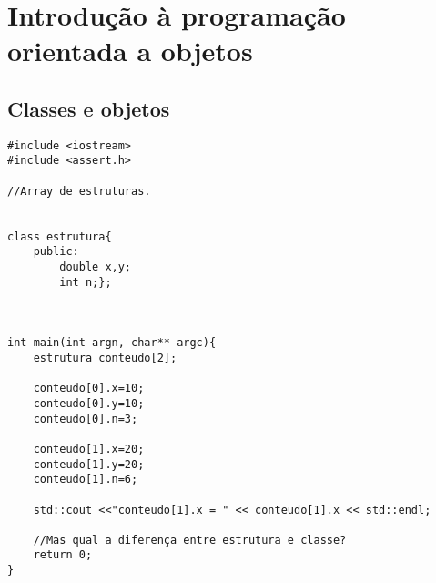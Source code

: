 
\chapter{Introdução à programação orientada a objetos}
\section{Classes e objetos}


\begin{verbatim}
#include <iostream>
#include <assert.h>

//Array de estruturas.


class estrutura{
	public:
		double x,y;
		int n;};



int main(int argn, char** argc){
	estrutura conteudo[2]; 
	
	conteudo[0].x=10;
	conteudo[0].y=10;
	conteudo[0].n=3;
	
	conteudo[1].x=20;
	conteudo[1].y=20;
	conteudo[1].n=6;

	std::cout <<"conteudo[1].x = " << conteudo[1].x << std::endl;

	//Mas qual a diferença entre estrutura e classe?
	return 0;
}

\end{verbatim}
